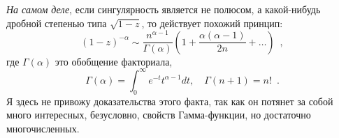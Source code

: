 \documentclass[a5paper]{article}
\theoremstyle{definition}
\begin{document}
\textit{На самом деле}, если сингулярность является не полюсом, а какой-нибудь
дробной степенью типа \( \sqrt{1 - z} \), то действует похожий принцип:
\begin{equation}
    [z^n] (1 - z)^{-\alpha} \sim
    \dfrac{n^{\alpha - 1}}{\Gamma(\alpha)} 
    \left(
        1 + \dfrac{\alpha(\alpha - 1)}{2n} + \ldots
    \right)
    \enspace ,
\end{equation}
где \( \Gamma(\alpha) \) это обобщение факториала,
\begin{equation}
    \Gamma(\alpha) = \int_{0}^\infty e^{-t} t^{\alpha - 1} dt
    , \quad
    \Gamma(n+1) = n! \enspace .
\end{equation}
Я здесь не привожу доказательства этого факта, так как он потянет за собой
много интересных, безусловно, свойств Гамма-функции, но достаточно
многочисленных.
\end{document}
